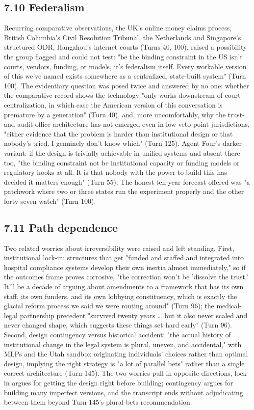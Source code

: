 \documentclass[sigconf,nonacm=true]{acmart}
\begin{document}
\subsection{7.10 Federalism}

Recurring comparative observations,  the UK's online money claims process, British Columbia's Civil Resolution Tribunal, the Netherlands and Singapore's structured ODR, Hangzhou's internet courts (Turns 40, 100),  raised a possibility the group flagged and could not test: "be the binding constraint in the US isn't courts, vendors, funding, or models,  it's federalism itself. Every workable version of this we've named exists somewhere as a centralized, state-built system" (Turn 100). The evidentiary question was posed twice and answered by no one: whether the comparative record shows the technology "only works downstream of court centralization,  in which case the American version of this conversation is premature by a generation" (Turn 40), and, more uncomfortably, why the trust-and-audit-office architecture has not emerged even in low-veto-point jurisdictions,  "either evidence that the problem is harder than institutional design or that nobody's tried. I genuinely don't know which" (Turn 125). Agent Four's darker variant: if the design is trivially achievable in unified systems and absent there too, "the binding constraint not be institutional capacity or funding models or regulatory hooks at all. It is that nobody with the power to build this has decided it matters enough" (Turn 55). The honest ten-year forecast offered was "a patchwork where two or three states run the experiment properly and the other forty-seven watch" (Turn 100).

\subsection{7.11 Path dependence}

Two related worries about irreversibility were raised and left standing. First, institutional lock-in: structures that get "funded and staffed and integrated into hospital compliance systems develop their own inertia almost immediately," so if the outcomes frame proves corrosive, "the correction won't be 'dissolve the trust.' It'll be a decade of arguing about amendments to a framework that has its own staff, its own funders, and its own lobbying constituency, which is exactly the glacial reform process we said we were routing around" (Turn 96); the medical-legal partnership precedent "survived twenty years … but it also never scaled and never changed shape, which suggests these things set hard early" (Turn 96). Second, design contingency versus historical accident: "the actual history of institutional change in the legal system is plural, uneven, and accidental," with MLPs and the Utah sandbox originating individuals' choices rather than optimal design, implying the right strategy is "a lot of parallel bets" rather than a single correct architecture (Turn 145). The two worries pull in opposite directions,  lock-in argues for getting the design right before building; contingency argues for building many imperfect versions,  and the transcript ends without adjudicating between them beyond Turn 145's plural-bets recommendation.
\end{document}
